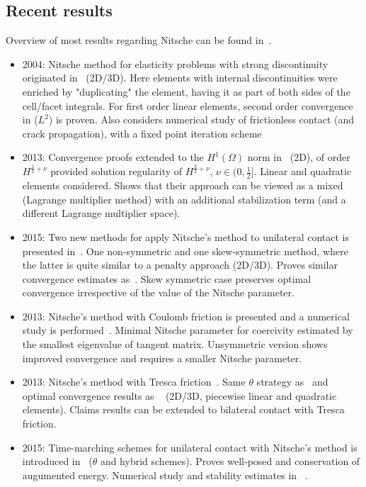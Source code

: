 \documentclass[12pt]{article}
\begin{document}
\subsection{Recent results}
Overview of most results regarding Nitsche can be found in~\cite{chouly2017nitsche}.
\begin{itemize}
\item 2004: Nitsche method for elasticity problems with strong discontinuity originated in~\cite{HANSBO20043523} (2D/3D). 
Here elements with internal discontinuities were enriched by "duplicating" the element, having it as part of both sides of the cell/facet integrals.
For first order linear elements, second order convergence in ($L^2$) is proven. Also considers numerical study of frictionless contact (and crack propagation), with a fixed point iteration scheme
\item 2013: Convergence proofs extended to the $H^1(\Omega)$ norm in~\cite{choly2013unilateral} (2D), of order $H^{\frac{1}{2}+\nu}$ provided solution regularity of $H^{\frac{3}{2}+\nu}$, $\nu\in(0,\frac{1}{2}]$.
Linear and quadratic elements considered.
Shows that their approach can be viewed as a mixed (Lagrange multiplier method) with an additional stabilization term (and a different Lagrange multiplier space).
\item 2015: Two new methods for apply Nitsche's method to unilateral contact is presented in~\cite{chouly2015symm}.
One non-symmetric and one skew-symmetric method, where the latter is quite similar to a penalty approach (2D/3D). Proves similar convergence estimates as~\cite{choly2013unilateral}.
Skew symmetric case preserves optimal convergence irrespective of the value of the Nitsche parameter.
\item  2013: Nitsche's method with Coulomb friction is presented and a numerical study is performed~\cite{RENARD201338}. 
Minimal Nitsche parameter for coercivity estimated by the smallest eigenvalue of tangent matrix. Unsymmetric version shows improved convergence and requires a smaller Nitsche parameter.
\item 2013: Nitsche's method with Tresca friction~\cite{CHOULY2014TRESCA}. Same $\theta$ strategy as~\cite{chouly2015symm} and optimal convergence results as ~\cite{choly2013unilateral} (2D/3D, piecewise linear and quadratic elements). Claims results can be extended to bilateral contact with Tresca friction.
\item 2015: Time-marching schemes for unilateral contact with Nitsche's method is introduced in~\cite{chouly2015timedep} ($\theta$ and hybrid schemes). Proves well-posed and conservation of augumented energy. Numerical study and stability estimates in ~\cite{chouly2015timedep2}.

\end{itemize}
\end{document}
